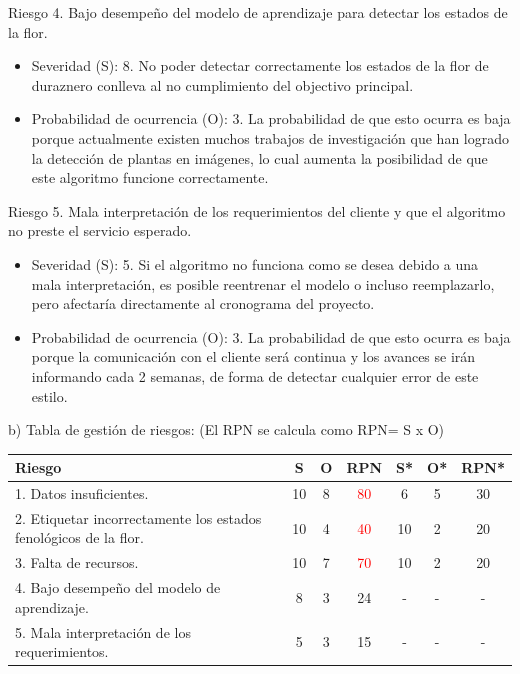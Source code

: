 \documentclass[
11pt, %
codirector, %
]{charter}
\begin{document}
Riesgo 4. Bajo desempeño del modelo de aprendizaje para detectar los estados de la flor.

\begin{itemize}
\item Severidad (S): 8. No poder detectar correctamente los estados de la flor de duraznero conlleva al no cumplimiento del objectivo principal. 

\item Probabilidad de ocurrencia (O): 3. La probabilidad de que esto ocurra es baja porque actualmente existen muchos trabajos de investigación que han logrado la detección de plantas en imágenes, lo cual aumenta la posibilidad de que este algoritmo funcione correctamente. 
\end{itemize}

Riesgo 5. Mala interpretación de los requerimientos del cliente y que el algoritmo no preste el servicio esperado.

\begin{itemize}
\item Severidad (S): 5. Si el algoritmo no funciona como se desea debido a una mala interpretación, es posible reentrenar el modelo o incluso reemplazarlo, pero afectaría directamente al cronograma del proyecto. 

\item Probabilidad de ocurrencia (O): 3. La probabilidad de que esto ocurra es baja porque la comunicación con el cliente será continua y los avances se irán informando cada 2 semanas, de forma de detectar cualquier error de este estilo. 
\end{itemize}

b) Tabla de gestión de riesgos:      (El RPN se calcula como RPN= S x O)

\begin{table}[htpb]
\centering
\begin{tabularx}{\linewidth}{@{}|X|c|c|c|c|c|c|@{}}
\hline
\rowcolor[HTML]{C0C0C0} 
Riesgo & S & O & RPN & S* & O* & RPN* \\ \hline
1. Datos insuficientes.      &  10 & 8 &  \textcolor{red}{80}  &  6  &  5  &   30   \\ \hline
2. Etiquetar incorrectamente los estados fenológicos de la flor.      &  10 & 4  &     \textcolor{red}{40} & 10   & 2   &  20    \\ \hline
3. Falta de recursos.       &  10 & 7  &  \textcolor{red}{70}   &  10  & 2   & 20      \\ \hline
4. Bajo desempeño del modelo de aprendizaje.       &  8 & 3  & 24  &  -  &  -  &     - \\ \hline
5. Mala interpretación de los requerimientos.       & 5  & 3  &  15   &  -  &   - &     - \\ \hline
\end{tabularx}%
\end{table}
\end{document}
